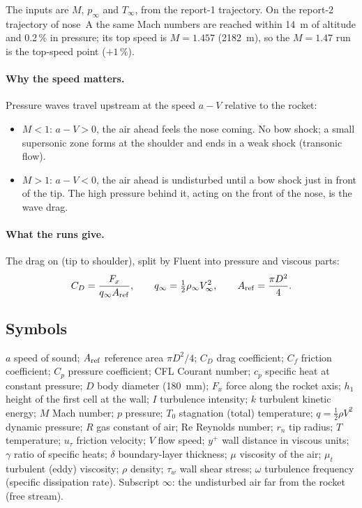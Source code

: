 \noindent The inputs are $M$, $p_\infty$ and $T_\infty$, from the report-1 trajectory. On the report-2
trajectory of nose~A the same Mach numbers are reached within \SI{14}{m} of altitude and 0.2\,\% in
pressure; its top speed is $M = 1.457$ (\SI{2182}{m}), so the $M = 1.47$ run is the top-speed point
($+1\,\%$).

\paragraph{Why the speed matters.} Pressure waves travel upstream at the speed $a - V$ relative to the
rocket:
\begin{itemize}
\item $M < 1$: $a - V > 0$, the air ahead feels the nose coming. No bow shock; a small supersonic zone
forms at the shoulder and ends in a weak shock (transonic flow).
\item $M > 1$: $a - V < 0$, the air ahead is undisturbed until a bow shock just in front of the tip. The
high pressure behind it, acting on the front of the nose, is the wave drag.
\end{itemize}

\paragraph{What the runs give.} The drag on  (tip to shoulder), split by Fluent into
pressure and viscous parts:
\begin{equation}
C_D = \frac{F_x}{q_\infty A_{\rm ref}}, \qquad q_\infty = \tfrac12\rho_\infty V_\infty^2, \qquad
A_{\rm ref} = \frac{\pi D^2}{4}.
\end{equation}

\subsection{Symbols}

\begin{small}
\noindent
$a$ speed of sound; $A_{\rm ref}$ reference area $\pi D^2/4$; $C_D$ drag coefficient; $C_f$ friction
coefficient; $C_p$ pressure coefficient; CFL Courant number; $c_p$ specific heat at constant pressure; $D$
body diameter (\SI{180}{mm}); $F_x$ force along the rocket axis; $h_1$ height of the first cell at the
wall; $I$ turbulence intensity; $k$ turbulent kinetic energy; $M$ Mach number; $p$ pressure; $T_0$
stagnation (total) temperature; $q = \tfrac12\rho V^2$ dynamic pressure; $R$ gas constant of
air; $\mathrm{Re}$ Reynolds number; $r_n$ tip radius; $T$ temperature; $u_\tau$ friction velocity; $V$
flow speed; $y^+$ wall distance in viscous units; $\gamma$ ratio of specific heats; $\delta$
boundary-layer thickness; $\mu$ viscosity of the air; $\mu_t$ turbulent (eddy) viscosity; $\rho$
density; $\tau_w$ wall shear stress; $\omega$ turbulence frequency (specific dissipation rate).
Subscript $\infty$: the undisturbed air far from the rocket (free stream).
\end{small}
